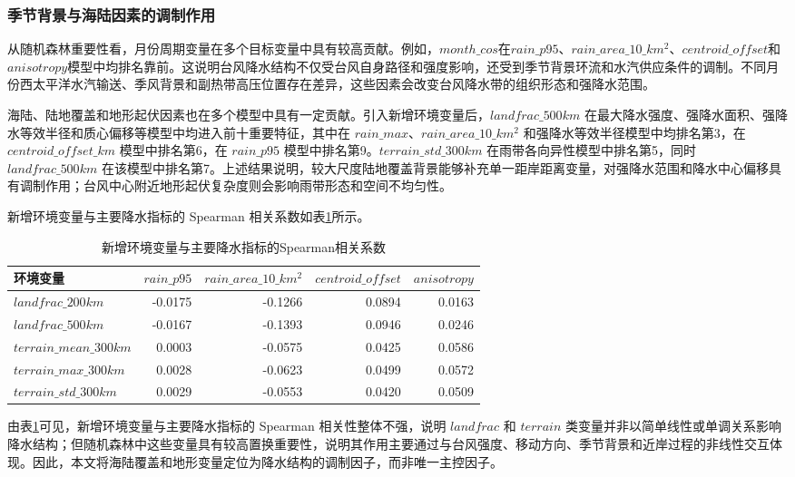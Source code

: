 \documentclass[UTF8,a4paper,zihao=5,fontset=fandol]{ctexart}
\numberwithin{equation}{section}
\numberwithin{figure}{section}
\numberwithin{table}{section}
\begin{document}
\subsubsection{季节背景与海陆因素的调制作用}

从随机森林重要性看，月份周期变量在多个目标变量中具有较高贡献。例如，$month\_cos$在$rain\_p95$、$rain\_area\_10\_km^2$、$centroid\_offset$和$anisotropy$模型中均排名靠前。这说明台风降水结构不仅受台风自身路径和强度影响，还受到季节背景环流和水汽供应条件的调制。不同月份西太平洋水汽输送、季风背景和副热带高压位置存在差异，这些因素会改变台风降水带的组织形态和强降水范围。

海陆、陆地覆盖和地形起伏因素也在多个模型中具有一定贡献。引入新增环境变量后，$landfrac\_500km$ 在最大降水强度、强降水面积、强降水等效半径和质心偏移等模型中均进入前十重要特征，其中在 $rain\_max$、$rain\_area\_10\_km^2$ 和强降水等效半径模型中均排名第3，在 $centroid\_offset\_km$ 模型中排名第6，在 $rain\_p95$ 模型中排名第9。$terrain\_std\_300km$ 在雨带各向异性模型中排名第5，同时 $landfrac\_500km$ 在该模型中排名第7。上述结果说明，较大尺度陆地覆盖背景能够补充单一距岸距离变量，对强降水范围和降水中心偏移具有调制作用；台风中心附近地形起伏复杂度则会影响雨带形态和空间不均匀性。

新增环境变量与主要降水指标的 Spearman 相关系数如表\ref{tab:env_spearman_problem1}所示。

\begin{table}[htbp]
    \centering
    \caption{新增环境变量与主要降水指标的Spearman相关系数}
    \label{tab:env_spearman_problem1}
    \small
    \begin{tabular}{lrrrr}
        \hline
        环境变量 & $rain\_p95$ & $rain\_area\_10\_km^2$ & $centroid\_offset$ & $anisotropy$ \\
        \hline
        $landfrac\_200km$ & -0.0175 & -0.1266 & 0.0894 & 0.0163 \\
        $landfrac\_500km$ & -0.0167 & -0.1393 & 0.0946 & 0.0246 \\
        $terrain\_mean\_300km$ & 0.0003 & -0.0575 & 0.0425 & 0.0586 \\
        $terrain\_max\_300km$ & 0.0028 & -0.0623 & 0.0499 & 0.0572 \\
        $terrain\_std\_300km$ & 0.0029 & -0.0553 & 0.0420 & 0.0509 \\
        \hline
    \end{tabular}
\end{table}

由表\ref{tab:env_spearman_problem1}可见，新增环境变量与主要降水指标的 Spearman 相关性整体不强，说明 $landfrac$ 和 $terrain$ 类变量并非以简单线性或单调关系影响降水结构；但随机森林中这些变量具有较高置换重要性，说明其作用主要通过与台风强度、移动方向、季节背景和近岸过程的非线性交互体现。因此，本文将海陆覆盖和地形变量定位为降水结构的调制因子，而非唯一主控因子。
\end{document}
